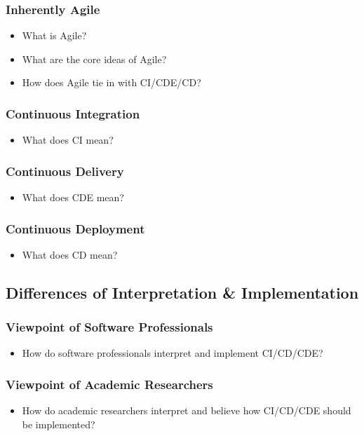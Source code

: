 \documentclass[11pt,a4paper]{article}
\begin{document}
		\subsubsection{Inherently Agile}
		\begin{itemize}[noitemsep]
			\item What is Agile? 
			\item What are the core ideas of Agile?
			\item How does Agile tie in with CI/CDE/CD?
		\end{itemize}
		\vspace{-7mm}
		\subsubsection{Continuous Integration}
		\begin{itemize}[noitemsep]
			\item What does CI mean?
		\end{itemize}
		\subsubsection{Continuous Delivery}
		\begin{itemize}[noitemsep]
			\item What does CDE mean?
		\end{itemize}
		\subsubsection{Continuous Deployment}
		\begin{itemize}[noitemsep]
			\item What does CD mean?
		\end{itemize}
		
	\subsection{Differences of Interpretation \& Implementation}
		\subsubsection{Viewpoint of Software Professionals}
		\begin{itemize}[noitemsep]
			\item How do software professionals interpret and implement CI/CD/CDE?
		\end{itemize}
		\subsubsection{Viewpoint of Academic Researchers}
		\begin{itemize}[noitemsep]
			\item How do academic researchers interpret and believe how CI/CD/CDE should be implemented?
		\end{itemize}
\end{document}
